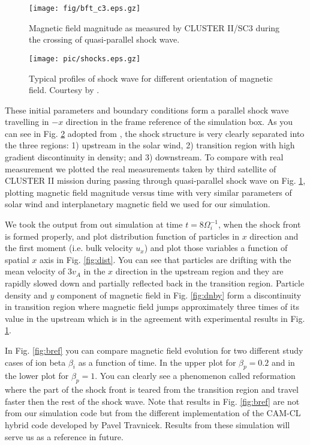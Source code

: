 \documentclass[oneside,branding,toc,article]{sat}
\begin{document}
\begin{figure}[!h]
  \centering
  \texttt{[image: fig/bft\_c3.eps.gz]}
  \caption{Magnetic field magnitude as measured by CLUSTER II/SC3 during the
    crossing of quasi-parallel shock wave.}
  \label{fig:cluster}
\end{figure}
\begin{figure}[!h]
  \centering
  \texttt{[image: pic/shocks.eps.gz]}
  \caption{Typical profiles of shock wave for different orientation of magnetic
    field. Courtesy by \cite{bt96}. }
  \label{fig:shocks}
\end{figure}

These initial parameters and boundary conditions form a parallel shock wave
travelling in $-x$ direction in the frame reference of the simulation box. As
you can see in Fig. \ref{fig:shocks} adopted from \cite{bt96}, the shock
structure is very clearly separated into the three regions: 1) upstream in the
solar wind, 2) transition region with high gradient discontinuity in density;
and 3) downstream.  To compare with real measurement we plotted the real
measurements taken by third satellite of CLUSTER II mission during passing
through quasi-parallel shock wave on Fig. \ref{fig:cluster}, plotting magnetic
field magnitude versus time with very similar parameters of solar wind and
interplanetary magnetic field we used for our simulation.

We took the output from out simulation at time $t=8 \Omega_i^{-1}$, when the
shock front is formed properly, and plot distribution function of particles in
$x$ direction and the first moment (i.e. bulk velocity $u_x$) and plot those
variables a function of spatial $x$ axis in Fig. \ref{fig:dist}.  You can see
that particles are drifting with the mean velocity of $3 v_A$ in the $x$
direction in the upstream region and they are rapidly slowed down and partially
reflected back in the transition region.  Particle density and $y$ component of
magnetic field in Fig. \ref{fig:dnby} form a discontinuity in transition region
where magnetic field jumps approximately three times of its value in the
upstream which is in the agreement with experimental results in
Fig. \ref{fig:cluster}.

In Fig. \ref{fig:bref} you can compare magnetic field evolution for two
different study cases of ion beta $\beta_i$ as a function of time.  In the
upper plot for $\beta_p = 0.2$ and in the lower plot for $\beta_p = 1$.  You
can clearly see a phenomenon called reformation where the part of the shock
front is teared from the transition region and travel faster then the rest of
the shock wave.  Note that results in Fig. \ref{fig:bref} are not from our
simulation code but from the different implementation of the CAM-CL hybrid code
developed by Pavel Travnicek.  Results from these simulation will serve us as a
reference in future.
\end{document}
